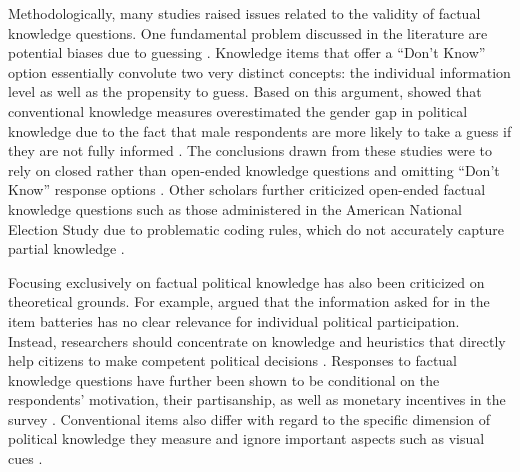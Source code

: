 \documentclass[12pt]{article}
\begin{document}
Methodologically, many studies raised issues related to the validity of factual knowledge questions. One fundamental problem discussed in the literature are potential biases due to guessing \citep{mondak2000reconsidering,mondak2001developing,mondak2001asked,miller2008experimenting}. Knowledge items that offer a ``Don't Know'' option essentially convolute two very distinct concepts: the individual information level as well as the propensity to guess. Based on this argument, \citet{mondak2004knowledge} showed that conventional knowledge measures overestimated the gender gap in political knowledge due to the fact that male respondents are more likely to take a guess if they are not fully informed \citep[see also][for a more recent discussion of differential item functioning as an explanation for knowledge gaps]{pietryka2013analysis}. The conclusions drawn from these studies were to rely on closed rather than open-ended knowledge questions and omitting ``Don't Know'' response options \citep[but see][]{sturgis2008experiment,luskin2011don}. Other scholars further criticized open-ended factual knowledge questions such as those administered in the American National Election Study due to problematic coding rules, which do not accurately capture partial knowledge \citep{krosnick2008problems,gibson2009knowing,debell2013harder}.

Focusing exclusively on factual political knowledge has also been criticized on theoretical grounds. For example, \citet{lupia2006elitism} argued that the information asked for in the item batteries has no clear relevance for individual political participation. Instead, researchers should concentrate on knowledge and heuristics that directly help citizens to make competent political decisions \citep[see also][]{lupia1994shortcuts}. Responses to factual knowledge questions have further been shown to be conditional on the respondents' motivation, their partisanship, as well as monetary incentives in the survey \citep{prior2008money,bullock2015partisan,prior2015you}. Conventional items also differ with regard to the specific dimension of political knowledge they measure \citep{barabas2014question} and ignore important aspects such as visual cues \citep{prior2014visual}.
\end{document}
